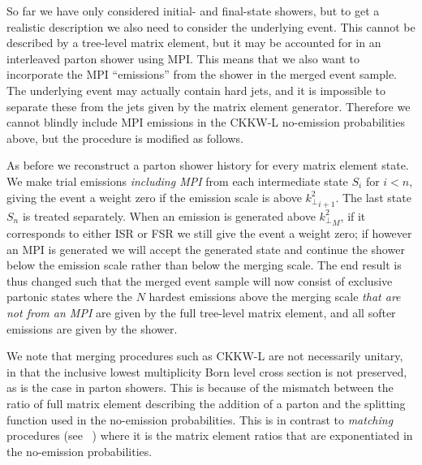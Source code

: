 So far we have only considered initial- and final-state showers, but
to get a realistic description we also need to consider the underlying
event. This cannot be described by a tree-level matrix element, but it
may be accounted for in an interleaved parton shower using MPI.
This means that we also want to incorporate the MPI ``emissions''
from the shower in the merged event sample. 
The underlying event may actually contain hard
jets, and it is impossible to separate these from the jets given by
the matrix element generator. Therefore we cannot blindly include MPI
emissions in the CKKW-L no-emission probabilities above, but the
procedure is modified \cite{Lonnblad:2011xx} as follows.

As before we reconstruct a parton shower history for every matrix
element state. We make trial emissions \textit{including MPI} 
from each intermediate state $S_i$ for $i<n$,
giving the event a weight zero if the emission scale is above ${k^2_\perp}_{i+1}$.
The last state $S_n$ is treated separately. 
When an emission is generated above ${k^2_\perp}_M$, if it corresponds to either
ISR or FSR we still give the event a weight zero; if
however an MPI is generated we will accept the generated state and
continue the shower below the emission scale rather than below the merging
scale.
The end result is thus changed such that the merged event sample will now
consist of exclusive partonic states where the $N$ hardest emissions
above the merging scale \emph{that are not from an MPI} are given by
the full tree-level matrix element, and all softer emissions are given by
the shower. 

  We note that merging procedures such as CKKW-L are not necessarily
  unitary, in that the inclusive lowest multiplicity Born level cross
  section is not preserved, as is the case in parton showers. This is
  because of the mismatch between the ratio of full matrix element
  describing the addition of a parton and the splitting function used
  in the no-emission probabilities. This is in contrast to
  \emph{matching} procedures (see \eg~\cite{Bengtsson:1987rw}) where
  it is the matrix element ratios that are exponentiated in the
  no-emission probabilities.

%
%

